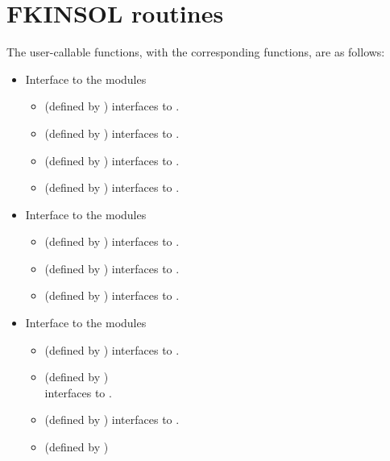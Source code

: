 \section{FKINSOL routines}\label{sss:fkinroutines}

The user-callable functions, with the corresponding {\kinsol} functions,
are as follows:
\begin{itemize}
\item
  Interface to the {\nvector} modules
  \begin{itemize}
  \item {} (defined by {\nvecs}) 
    interfaces to .
  \item {} (defined by {\nvecp}) 
    interfaces to .
  \item {} (defined by {\nvecopenmp}) 
    interfaces to .
  \item {} (defined by {\nvecpthreads}) 
    interfaces to .
  \end{itemize}
\item
  Interface to the {\sunmatrix} modules
  \begin{itemize}
  \item {} (defined by {\sunmatband}) 
    interfaces to .
  \item {} (defined by {\sunmatdense}) 
    interfaces to .
  \item {} (defined by {\sunmatsparse}) 
    interfaces to .
  \end{itemize}
\item
  Interface to the {\sunlinsol} modules
  \begin{itemize}
  \item {} (defined by {\sunlinsolband}) 
    interfaces to .
  \item {} (defined by {\sunlinsoldense}) \\
    interfaces to .
  \item {} (defined by {\sunlinsolklu}) 
    interfaces to .
  \item {} (defined by {\sunlinsolklu}) 

\end{itemize}
\end{itemize}
